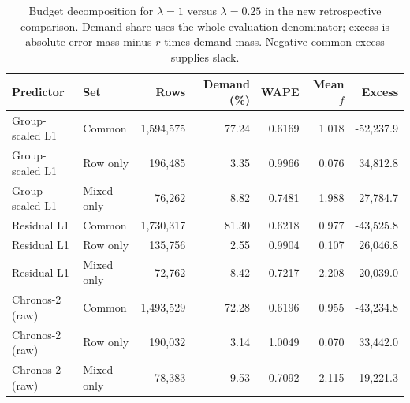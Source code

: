 \begin{table}[htbp]\centering\small
\caption{Budget decomposition for $\lambda=1$ versus $\lambda=0.25$ in the new retrospective comparison. Demand share uses the whole evaluation denominator; excess is absolute-error mass minus $r$ times demand mass. Negative common excess supplies slack.}
\label{tab:accuracy-budget}
\begin{tabular}{llrrrrr}\toprule
Predictor & Set & Rows & Demand (\%) & WAPE & Mean $f$ & Excess\\\midrule
Group-scaled L1 & Common & 1,594,575 & 77.24 & 0.6169 & 1.018 & -52,237.9 \\
Group-scaled L1 & Row only & 196,485 & 3.35 & 0.9966 & 0.076 & 34,812.8 \\
Group-scaled L1 & Mixed only & 76,262 & 8.82 & 0.7481 & 1.988 & 27,784.7 \\
Residual L1 & Common & 1,730,317 & 81.30 & 0.6218 & 0.977 & -43,525.8 \\
Residual L1 & Row only & 135,756 & 2.55 & 0.9904 & 0.107 & 26,046.8 \\
Residual L1 & Mixed only & 72,762 & 8.42 & 0.7217 & 2.208 & 20,039.0 \\
Chronos-2 (raw) & Common & 1,493,529 & 72.28 & 0.6196 & 0.955 & -43,234.8 \\
Chronos-2 (raw) & Row only & 190,032 & 3.14 & 1.0049 & 0.070 & 33,442.0 \\
Chronos-2 (raw) & Mixed only & 78,383 & 9.53 & 0.7092 & 2.115 & 19,221.3 \\\bottomrule\end{tabular}\end{table}